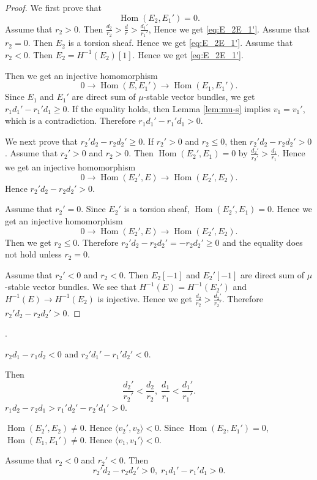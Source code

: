 \documentclass[10pt]{amsart}
\newenvironment{NB}{
\color{red}{\bf NB}. \footnotesize 
}{}
\newcommand{\Hom}{\operatorname{Hom}}
\numberwithin{equation}{section}
\theoremstyle{plain}
\theoremstyle{definition}
\theoremstyle{remark}
\begin{document}
\begin{proof}
We first prove that
\begin{equation}\label{eq:E_2E_1'}
\Hom(E_2,E_1')=0.
\end{equation}
Assume that $r_2>0$. Then 
$\frac{d_2}{r_2}>\frac{d}{r}>\frac{d_1'}{r_1'}$,
Hence we get \eqref{eq:E_2E_1'}.
Assume that $r_2=0$. Then
$E_2$ is a torsion sheaf. Hence we get \eqref{eq:E_2E_1'}.
Assume that $r_2<0$.
Then $E_2=H^{-1}(E_2)[1]$. Hence we get \eqref{eq:E_2E_1'}.

Then we get an injective homomorphism
$$
0 \to \Hom(E,E_1') \to \Hom(E_1,E_1').
$$
Since $E_1$ and $E_1'$ are direct sum of $\mu$-stable vector bundles, 
we get $r_1 d_1'-r_1' d_1 \geq 0$.
If the equality holds, then Lemma \ref{lem:mu-s} implies $v_1=v_1'$, which is a contradiction.
Therefore $r_1 d_1'-r_1' d_1 >0$.

We next prove that $r_2' d_2-r_2 d_2' \geq 0$.
If $r_2'>0$ and
$r_2 \leq 0$, then $r_2' d_2-r_2 d_2'>0$.
Assume that $r_2'>0$ and $r_2>0$.
Then $\Hom(E_2',E_1)=0$ by $\frac{d_2'}{r_2'}>\frac{d_1}{r_1}$.
Hence 
we get an injective homomorphism
$$
0 \to \Hom(E_2',E) \to \Hom(E_2',E_2).
$$
Hence $r_2' d_2-r_2 d_2'>0$.

Assume that $r_2'=0$.
Since $E_2'$ is a torsion sheaf, $\Hom(E_2',E_1)=0$.
Hence
we get an injective homomorphism
$$
0 \to \Hom(E_2',E) \to \Hom(E_2',E_2).
$$
Then we get $r_2 \leq 0$. 
Therefore $r_2' d_2-r_2 d_2' =-r_2 d_2' \geq 0$ and the equality does not hold
unless $r_2=0$.

Assume that $r_2'<0$ and $r_2<0$.
Then $E_2[-1]$ and $E_2'[-1]$ are direct sum of $\mu$-stable vector bundles. 
We see that $H^{-1}(E)=H^{-1}(E_2')$ and $H^{-1}(E) \to H^{-1}(E_2)$ is injective.
Hence we get $\frac{d_2}{r_2}>\frac{d_2'}{r_2'}$.
Therefore $r_2' d_2-r_2 d_2' > 0$.
\end{proof}

\begin{NB}
$r_2 d_1-r_1 d_2<0$ and $r_2' d_1'-r_1' d_2'<0$.

Then 
\begin{equation}
\frac{d_2'}{r_2'}<\frac{d_2}{r_2},\;\frac{d_1}{r_1}<\frac{d_1'}{r_1'}.
\end{equation}
$r_1 d_2-r_2 d_1>r_1' d_2'-r_2' d_1'>0$.

$\Hom(E_2',E_2) \ne 0$. Hence $\langle v_2',v_2 \rangle<0$.
Since $\Hom(E_2,E_1')=0$, $\Hom(E_1,E_1') \ne 0$. Hence
$\langle v_1,v_1' \rangle<0$.




Assume that $r_2<0$ and $r_2'<0$.
Then 
$$
r_2' d_2-r_2 d_2'>0,\; r_1 d_1'-r_1' d_1>0.
$$
\end{NB}
\end{document}
